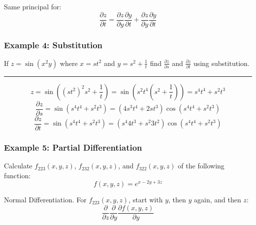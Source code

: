Same principal for:
$${\frac{\partial z}{\partial t}}={\frac{\partial z}{\partial y}}{\frac{\partial y}{\partial t}}+{\frac{\partial z}{\partial y}}{\frac{\partial y}{\partial t}}$$


\subsubsection{Example 4: Substitution}
If $z=\sin(x^2y)$ where $x=st^2$ and $y=s^2+\frac{1}{t}$ find $\frac{\partial z}{\partial s}$ and $\frac{\partial z}{\partial t}$ using substitution.

\rule{\textwidth}{0.5pt}

$$z=\sin\left((st^2)^2s^2+\frac{1}{t}\right)=\sin\left(s^2t^4(s^2+\frac{1}{t})\right)=s^4t^4+s^2t^3$$
$$\frac{\partial z}{\partial s}=\sin(s^4t^4+s^2t^3)=(4s^3t^4+2st^3)\cos(s^4t^4+s^2t^3)$$
$$\frac{\partial z}{\partial t}=\sin(s^4t^4+s^2t^3)=(s^4 4t^3+s^2 3t^2)\cos(s^4t^4+s^2t^3)$$

\subsubsection{Example 5: Partial Differentiation}
Calculate $f_{223}(x,y,z)$, $f_{232}(x,y,z)$, and $f_{322}(x,y,z)$ of the following function:
$$f(x,y,z)=e^{x-2y+3z}$$

Normal Differentiation. For $f_{223}(x,y,z)$, start with $y$, then $y$ again, and then $z$:
$$\frac{\partial }{\partial z}\frac{\partial }{\partial y}\frac{\partial f(x,y,z)}{\partial y}$$
